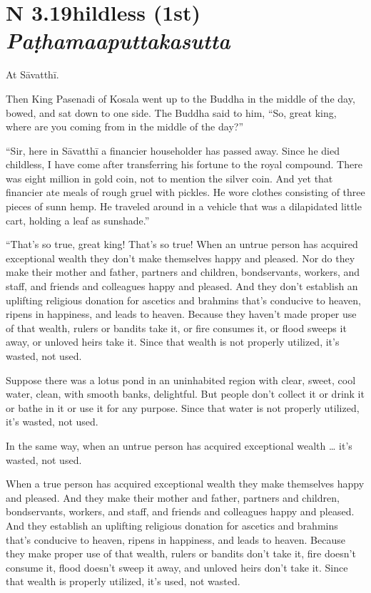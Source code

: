 \documentclass[12pt,openany]{book}%
\newcommand*{\suttatitleacronym}[1]{\smaller[2]{#1}\vspace*{.3em}}
\newcommand*{\suttatitletranslation}[1]{\linebreak{#1}}
\newcommand*{\suttatitleroot}[1]{\linebreak\smaller[2]\itshape{#1}}
\newcommand*{\tocacronym}[1]{\hspace*{-3.3em}{#1}\quad}
\newcommand*{\toctranslation}[1]{#1}
\newcommand*{\tocroot}[1]{(\textit{#1})}
\begin{document}
%
\section*{{\suttatitleacronym SN 3.19}{\suttatitletranslation Childless (1st) }{\suttatitleroot Paṭhamaaputtakasutta}}
\addcontentsline{toc}{section}{\tocacronym{SN 3.19} \toctranslation{Childless (1st) } \tocroot{Paṭhamaaputtakasutta}}

At \textsanskrit{Sāvatthī}. 

Then King Pasenadi of Kosala went up to the Buddha in the middle of the day, bowed, and sat down to one side. The Buddha said to him, “So, great king, where are you coming from in the middle of the day?” 

“Sir, here in \textsanskrit{Sāvatthī} a financier householder has passed away. Since he died childless, I have come after transferring his fortune to the royal compound. There was eight million in gold coin, not to mention the silver coin. And yet that financier ate meals of rough gruel with pickles. He wore clothes consisting of three pieces of sunn hemp. He traveled around in a vehicle that was a dilapidated little cart, holding a leaf as sunshade.” 

“That’s so true, great king! That’s so true! When an untrue person has acquired exceptional wealth they don’t make themselves happy and pleased. Nor do they make their mother and father, partners and children, bondservants, workers, and staff, and friends and colleagues happy and pleased. And they don’t establish an uplifting religious donation for ascetics and brahmins that’s conducive to heaven, ripens in happiness, and leads to heaven. Because they haven’t made proper use of that wealth, rulers or bandits take it, or fire consumes it, or flood sweeps it away, or unloved heirs take it. Since that wealth is not properly utilized, it’s wasted, not used. 

Suppose there was a lotus pond in an uninhabited region with clear, sweet, cool water, clean, with smooth banks, delightful. But people don’t collect it or drink it or bathe in it or use it for any purpose. Since that water is not properly utilized, it’s wasted, not used. 

In the same way, when an untrue person has acquired exceptional wealth … it’s wasted, not used. 

When a true person has acquired exceptional wealth they make themselves happy and pleased. And they make their mother and father, partners and children, bondservants, workers, and staff, and friends and colleagues happy and pleased. And they establish an uplifting religious donation for ascetics and brahmins that’s conducive to heaven, ripens in happiness, and leads to heaven. Because they make proper use of that wealth, rulers or bandits don’t take it, fire doesn’t consume it, flood doesn’t sweep it away, and unloved heirs don’t take it. Since that wealth is properly utilized, it’s used, not wasted. 
\end{document}
